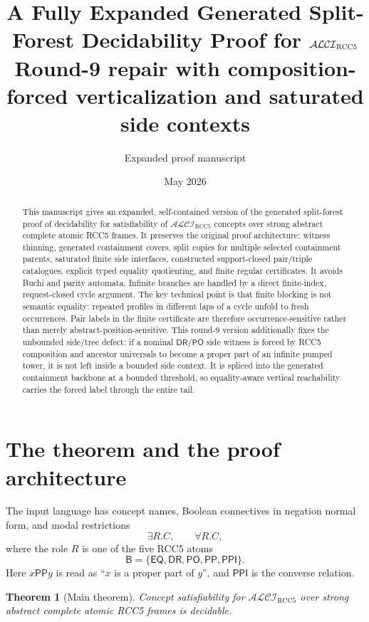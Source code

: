 \documentclass[11pt]{article}
\title{A Fully Expanded Generated Split-Forest Decidability Proof for $\Logic$\\
       \large Round-9 repair with composition-forced verticalization and saturated side contexts}
\author{Expanded proof manuscript}
\date{May 2026}
\newtheorem{theorem}{Theorem}[section]
\newcommand{\Logic}{\mathcal{ALCI}_{\mathrm{RCC5}}}
\newcommand{\Base}{\mathsf B}
\newcommand{\EQ}{\mathsf{EQ}}
\newcommand{\DR}{\mathsf{DR}}
\newcommand{\PO}{\mathsf{PO}}
\newcommand{\PP}{\mathsf{PP}}
\newcommand{\PPI}{\mathsf{PPI}}
\begin{document}
\maketitle

\begin{abstract}
This manuscript gives an expanded, self-contained version of the generated split-forest proof of decidability for satisfiability of $\Logic$ concepts over strong abstract complete atomic RCC5 frames.  It preserves the original proof architecture: witness thinning, generated containment covers, split copies for multiple selected containment parents, saturated finite side interfaces, constructed support-closed pair/triple catalogues, explicit typed equality quotienting, and finite regular certificates.  It avoids Buchi and parity automata.  Infinite branches are handled by a direct finite-index, request-closed cycle argument.  The key technical point is that finite blocking is not semantic equality: repeated profiles in different laps of a cycle unfold to fresh occurrences.  Pair labels in the finite certificate are therefore occurrence-sensitive rather than merely abstract-position-sensitive.  This round-9 version additionally fixes the unbounded side/tree defect: if a nominal $\DR/\PO$ side witness is forced by RCC5 composition and ancestor universals to become a proper part of an infinite pumped tower, it is not left inside a bounded side context.  It is spliced into the generated containment backbone at a bounded threshold, so equality-aware vertical reachability carries the forced label through the entire tail.
\end{abstract}

\tableofcontents

\section{The theorem and the proof architecture}

The input language has concept names, Boolean connectives in negation normal form, and modal restrictions
\[
   \exists R.C,\qquad \forall R.C,
\]
where the role $R$ is one of the five RCC5 atoms
\[
   \Base=\{\EQ,\DR,\PO,\PP,\PPI\}.
\]
Here $x\PP y$ is read as ``$x$ is a proper part of $y$'', and $\PPI$ is the converse relation.

\begin{theorem}[Main theorem]\label{thm:main}
Concept satisfiability for $\Logic$ over strong abstract complete atomic RCC5 frames is decidable.
\end{theorem}
\end{document}
